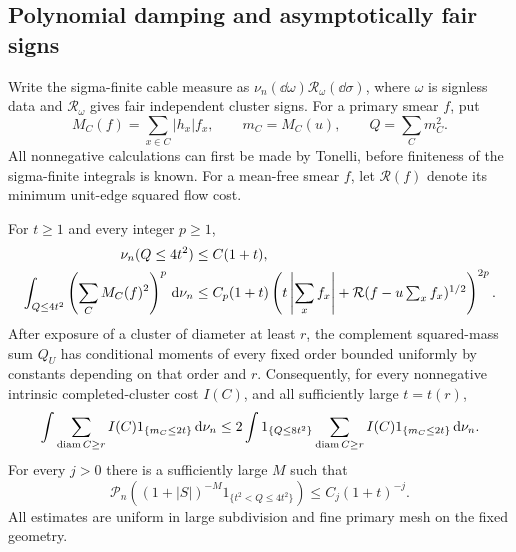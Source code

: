 \subsection{Polynomial damping and asymptotically fair signs}

Write the sigma-finite cable measure as
\(\nu_n(\dd\omega)\mathcal R_\omega(\dd\sigma)\), where \(\omega\)
is signless data and \(\mathcal R_\omega\) gives fair independent
cluster signs. For a primary smear \(f\), put
\[
 M_C(f)=\sum_{x\in C}|h_x|f_x,\qquad
 m_C=M_C(u),\qquad Q=\sum_Cm_C^2.
\]
All nonnegative calculations can first be made by Tonelli,
before finiteness of the sigma-finite integrals is known.
For a mean-free smear \(f\), let \(\mathcal R(f)\) denote its
minimum unit-edge squared flow cost.

\begin{lemma}
\label{lem:pins-tails}
For \(t\ge1\) and every integer \(p\ge1\),
\begin{align}
 \nu_n(Q\le4t^2)&\le C(1+t),\notag\\
 \int_{Q\le4t^2}
       \left(\sum_CM_C(f)^2\right)^p\,\mathrm d\nu_n
 &\le C_p(1+t)
 \left(t\left|\sum_xf_x\right|
       +\mathcal R(f-u\textstyle\sum_xf_x)^{1/2}\right)^{2p}.
 \label{eq:pins-bin}
\end{align}
After exposure of a cluster of diameter at least \(r\), the
complement squared-mass sum \(Q_U\) has conditional moments of
every fixed order bounded uniformly by constants depending on
that order and \(r\). Consequently, for every nonnegative
intrinsic completed-cluster cost \(I(C)\), and all sufficiently
large \(t=t(r)\),
\begin{equation}
 \int\sum_{\operatorname{diam} C\ge r}I(C)1_{\{m_C\le2t\}}\,\mathrm d\nu_n
 \le
 2\int1_{\{Q\le8t^2\}}
       \sum_{\operatorname{diam} C\ge r}I(C)1_{\{m_C\le2t\}}\,\mathrm d\nu_n.
 \label{eq:pins-reinsertion}
\end{equation}
For every \(j>0\) there is a sufficiently large \(M\) such that
\begin{equation}
 \mathcal P_n\left((1+|S|)^{-M}
                   1_{\{t^2<Q\le4t^2\}}\right)
       \le C_j(1+t)^{-j}.
 \label{eq:pins-damped-tail}
\end{equation}
All estimates are uniform in large subdivision and fine primary
mesh on the fixed geometry.
\end{lemma}

